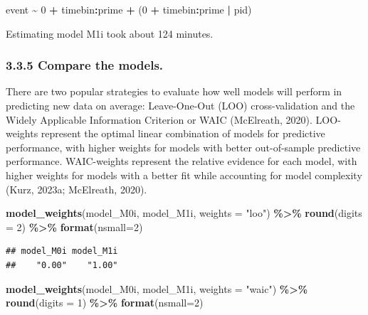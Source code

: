 \documentclass[
  man, donotrepeattitle,floatsintext]{apa6}
\newenvironment{Shaded}{\begin{snugshade}}{\end{snugshade}}
\newcommand{\AttributeTok}[1]{\textcolor[rgb]{0.13,0.29,0.53}{#1}}
\newcommand{\DecValTok}[1]{\textcolor[rgb]{0.00,0.00,0.81}{#1}}
\newcommand{\FunctionTok}[1]{\textcolor[rgb]{0.13,0.29,0.53}{\textbf{#1}}}
\newcommand{\NormalTok}[1]{#1}
\newcommand{\SpecialCharTok}[1]{\textcolor[rgb]{0.81,0.36,0.00}{\textbf{#1}}}
\newcommand{\StringTok}[1]{\textcolor[rgb]{0.31,0.60,0.02}{#1}}
\begin{document}
\begin{Shaded}
\begin{Highlighting}[]
\NormalTok{event }\SpecialCharTok{\textasciitilde{}} \DecValTok{0} \SpecialCharTok{+}\NormalTok{ timebin}\SpecialCharTok{:}\NormalTok{prime }\SpecialCharTok{+}\NormalTok{ (}\DecValTok{0} \SpecialCharTok{+}\NormalTok{ timebin}\SpecialCharTok{:}\NormalTok{prime }\SpecialCharTok{|}\NormalTok{ pid)}
\end{Highlighting}
\end{Shaded}

Estimating model M1i took about 124 minutes.

\subsubsection{3.3.5 Compare the models.}\label{compare-the-models.}

There are two popular strategies to evaluate how well models will perform in predicting new data on average: Leave-One-Out (LOO) cross-validation and the Widely Applicable Information Criterion or WAIC (McElreath, 2020). LOO-weights represent the optimal linear combination of models for predictive performance, with higher weights for models with better out-of-sample predictive performance. WAIC-weights represent the relative evidence for each model, with higher weights for models with a better fit while accounting for model complexity (Kurz, 2023a; McElreath, 2020).

\footnotesize

\begin{Shaded}
\begin{Highlighting}[]
\FunctionTok{model\_weights}\NormalTok{(model\_M0i, model\_M1i, }\AttributeTok{weights =} \StringTok{"loo"}\NormalTok{) }\SpecialCharTok{\%\textgreater{}\%} \FunctionTok{round}\NormalTok{(}\AttributeTok{digits =} \DecValTok{2}\NormalTok{) }\SpecialCharTok{\%\textgreater{}\%} \FunctionTok{format}\NormalTok{(}\AttributeTok{nsmall=}\DecValTok{2}\NormalTok{)}
\end{Highlighting}
\end{Shaded}

\begin{verbatim}
## model_M0i model_M1i 
##    "0.00"    "1.00"
\end{verbatim}

\begin{Shaded}
\begin{Highlighting}[]
\FunctionTok{model\_weights}\NormalTok{(model\_M0i, model\_M1i, }\AttributeTok{weights =} \StringTok{"waic"}\NormalTok{) }\SpecialCharTok{\%\textgreater{}\%} \FunctionTok{round}\NormalTok{(}\AttributeTok{digits =} \DecValTok{1}\NormalTok{) }\SpecialCharTok{\%\textgreater{}\%} \FunctionTok{format}\NormalTok{(}\AttributeTok{nsmall=}\DecValTok{2}\NormalTok{)}
\end{Highlighting}
\end{Shaded}
\end{document}
